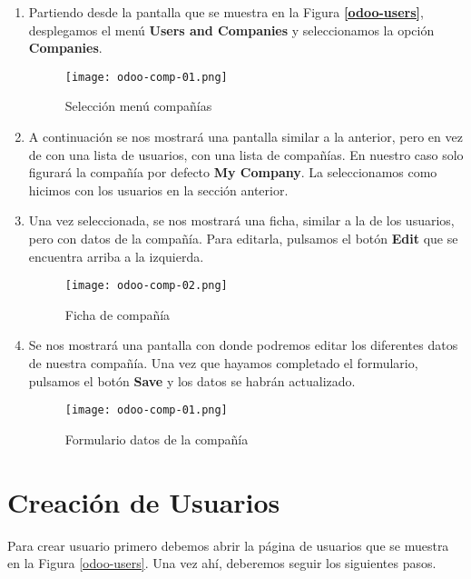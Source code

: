 \begin{enumerate}
    \item Partiendo desde la pantalla que se muestra en la Figura \textbf{\ref{odoo-users}}, desplegamos el menú \textbf{Users and Companies} y seleccionamos la opción \textbf{Companies}.

    \begin{figure}[h]
        \centering
        \texttt{[image: odoo-comp-01.png]}
        \caption{Selección menú compañías}
    \end{figure}

    \item A continuación se nos mostrará una pantalla similar a la anterior, pero en vez de con una lista de usuarios, con una lista de compañías. En nuestro caso solo figurará la compañía por defecto \textbf{My Company}. La seleccionamos como hicimos con los usuarios en la sección anterior.

    \item Una vez seleccionada, se nos mostrará una ficha, similar a la de los usuarios, pero con datos de la compañía. Para editarla, pulsamos el botón \textbf{Edit} que se encuentra arriba a la izquierda.

     \begin{figure}[h]
        \centering
        \texttt{[image: odoo-comp-02.png]}
        \caption{Ficha de compañía}
    \end{figure}

    \item Se nos mostrará una pantalla con donde podremos editar los diferentes datos de nuestra compañía. Una vez que hayamos completado el formulario, pulsamos el botón \textbf{Save} y los datos se habrán actualizado.

    \begin{figure}[h]
        \centering
        \texttt{[image: odoo-comp-01.png]}
        \caption{Formulario datos de la compañía}
    \end{figure}
\end{enumerate}

\section{Creación de Usuarios}
Para crear usuario primero debemos abrir la página de usuarios que se muestra en la Figura \ref{odoo-users}. Una vez ahí, deberemos seguir los siguientes pasos.

